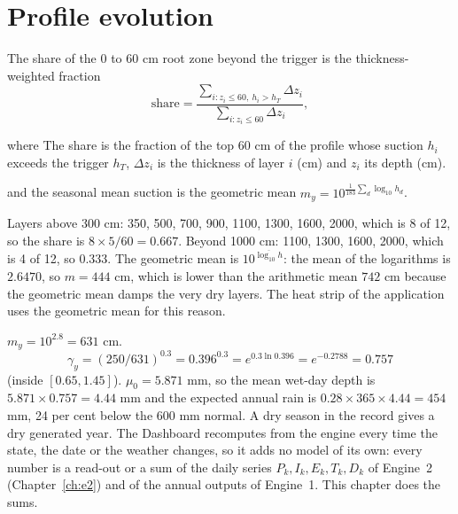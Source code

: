 \section{Profile evolution}
The share of the 0 to 60 cm root zone beyond the trigger is the thickness-weighted fraction
\begin{equation}\boxed{\mathrm{share}=\frac{\sum_{i:z_i\le60,\ h_i>h_T}\Delta z_i}{\sum_{i:z_i\le60}\Delta z_i},}\end{equation}
\par\noindent where The share is the fraction of the top 60 cm of the profile whose suction $h_i$ exceeds the trigger $h_T$, $\Delta z_i$ is the thickness of layer $i$ (cm) and $z_i$ its depth (cm).

and the seasonal mean suction is the geometric mean $m_y=10^{\frac1{183}\sum_d\log_{10}h_d}$.

\sol {}\ans Layers above 300 cm: 350, 500, 700, 900, 1100, 1300, 1600, 2000, which is 8 of 12, so the share is $8\times5/60=0.667$. Beyond 1000 cm: 1100, 1300, 1600, 2000, which is 4 of 12, so $0.333$. The geometric mean is $10^{\overline{\log_{10}h}}$: the mean of the logarithms is $2.6470$, so $m=444$ cm, which is lower than the arithmetic mean $742$ cm because the geometric mean damps the very dry layers. The heat strip of the application uses the geometric mean for this reason. \finans


\sol {}\ans $m_y=10^{2.8}=631$ cm. \[\gamma_y=(250/631)^{0.3}=0.396^{0.3}=e^{0.3\ln0.396}=e^{-0.2788}=0.757\] (inside $[0.65,1.45]$). $\mu_0=5.871$ mm, so the mean wet-day depth is $5.871\times0.757=4.44$ mm and the expected annual rain is $0.28\times365\times4.44=454$ mm, 24 per cent below the 600 mm normal. A dry season in the record gives a dry generated year.
\label{ch:dash}
The Dashboard recomputes from the engine every time the state, the date or the weather changes, so it adds no model of its own: every number is a read-out or a sum of the daily series $P_k,I_k,E_k,T_k,D_k$ of Engine~2 (Chapter~\ref{ch:e2}) and of the annual outputs of Engine~1. This chapter does the sums. \finans

